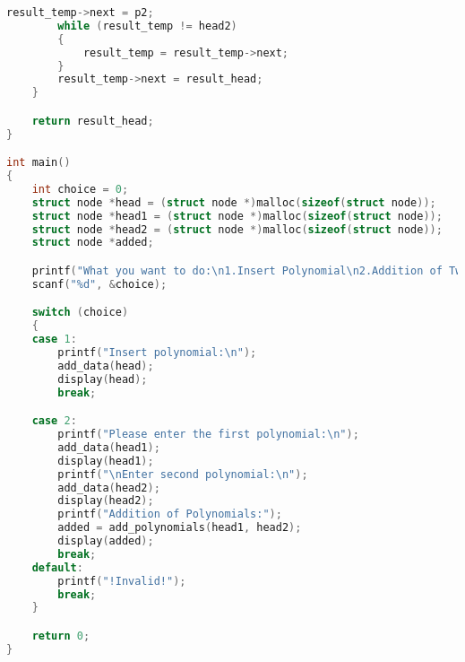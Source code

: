 \documentclass{article}
\begin{document}
\begin{lstlisting}[language = c++, caption = Input Code]
        result_temp->next = p2;
        while (result_temp != head2)
        {
            result_temp = result_temp->next;
        }
        result_temp->next = result_head;
    }

    return result_head;
}

int main()
{
    int choice = 0;
    struct node *head = (struct node *)malloc(sizeof(struct node));
    struct node *head1 = (struct node *)malloc(sizeof(struct node));
    struct node *head2 = (struct node *)malloc(sizeof(struct node));
    struct node *added;

    printf("What you want to do:\n1.Insert Polynomial\n2.Addition of Two polynomials:\n");
    scanf("%d", &choice);

    switch (choice)
    {
    case 1:
        printf("Insert polynomial:\n");
        add_data(head);
        display(head);
        break;

    case 2:
        printf("Please enter the first polynomial:\n");
        add_data(head1);
        display(head1);
        printf("\nEnter second polynomial:\n");
        add_data(head2);
        display(head2);
        printf("Addition of Polynomials:");
        added = add_polynomials(head1, head2);
        display(added);
        break;
    default:
        printf("!Invalid!");
        break;
    }

    return 0;
}
\end{lstlisting}
\end{document}
